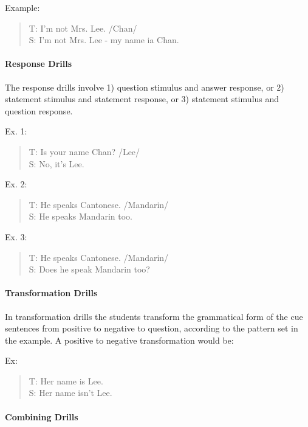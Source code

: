 \noindent Example:

\begin{quote}
T: I'm not Mrs. Lee. /Chan/ \\
S: I'm not Mrs. Lee - my name ia Chan. \\
\end{quote}

\paragraph{Response Drills}

The response drills involve 1) question stimulus and answer response, or 2) statement stimulus and statement response, or 3) statement stimulus and question response.

\noindent Ex. 1:
\begin{quote}
T: Is your name Chan? /Lee/ \\
S: No, it's Lee. \\
\end{quote}

\noindent Ex. 2:
\begin{quote}
T: He speaks Cantonese. /Mandarin/ \\
S: He speaks Mandarin too. \\
\end{quote}

\noindent Ex. 3:
\begin{quote}
T: He speaks Cantonese. /Mandarin/ \\
S: Does he speak Mandarin too? \\
\end{quote}

\paragraph{Transformation Drills}

In transformation drills the students transform the grammatical form of the cue sentences from positive to negative to question, according to the pattern set in the example. A positive to negative transformation would be:

\noindent Ex:
\begin{quote}
T: Her name is Lee. \\
S: Her name isn't Lee. \\
\end{quote}

\paragraph{Combining Drills}

